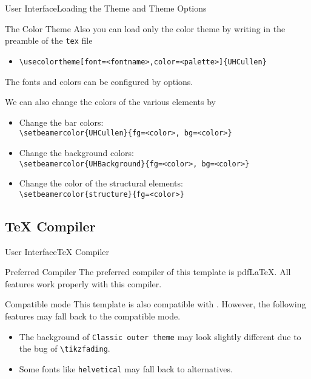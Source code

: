 \documentclass[10pt,xcolor={dvipsnames},aspectratio=169]{beamer}
\begin{document}
\begin{frame}{User Interface}{Loading the Theme and Theme Options}
  \begin{block}{The Color Theme}
    \small
    Also you can load only the color theme by writing in the preamble of the {\tt tex} file 
    \begin{itemize}
      \item {\tt \textbackslash usecolortheme[font=<fontname>,color=<palette>]\{UHCullen\}}
    \end{itemize}
    The fonts and colors can be configured by options.

    We can also change the colors of the various elements by
    \begin{itemize}
      \item Change the bar colors: \\    
      {\tt \textbackslash setbeamercolor\{UHCullen\}\{fg=<color>, bg=<color>\}}
  
      \item Change the background colors: \\    
      {\tt \textbackslash setbeamercolor\{UHBackground\}\{fg=<color>, bg=<color>\}}
  
      \item Change the color of the structural elements: \\    
      {\tt \textbackslash setbeamercolor\{structure\}\{fg=<color>\}}
    \end{itemize}
  \end{block}
\end{frame}


\subsection{TeX Compiler}
\begin{frame}{User Interface}{TeX Compiler}
  \begin{block}{Preferred Compiler}
    The preferred compiler of this template is pdf\LaTeX. All features work properly with this compiler.
  \end{block}
  \begin{block}{Compatible mode}
    This template is also compatible with \XeLaTeX. However, the following features may fall back to the compatible mode.
    \begin{itemize}
      \item The background of \texttt{Classic outer theme} may look slightly different due to the bug of \texttt{\textbackslash tikzfading}.
      \item Some fonts like \texttt{helvetical} may fall back to alternatives.
    \end{itemize}
  \end{block}
\end{frame}
\end{document}

